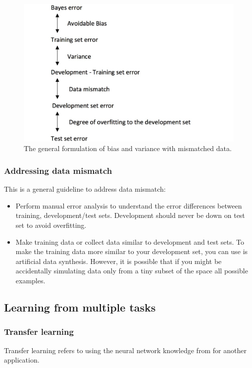 \documentclass[UTF8]{article}
\begin{document}
\begin{figure}[htb]
    \centering
    \includegraphics[width=40em]{figures/data-mismatched-general-formulation}
    \caption{The general formulation of bias and variance with mismatched data.}
    \label{fig:data-mismatched-general-formulation}
\end{figure}

\subsubsection{Addressing data mismatch}
This is a general guideline to address data mismatch:
\begin{itemize}
    \item Perform manual error analysis to understand the error differences between training,
    development/test sets. Development should never be down on test set to avoid overfitting.
    \item Make training data or collect data similar to development and test sets. To make the
    training data more similar to your development set, you can use is artificial data synthesis.
    However, it is possible that if you might be accidentally simulating data only from a tiny
    subset of the space all possible examples.
\end{itemize}

\subsection{Learning from multiple tasks}
\subsubsection{Transfer learning}
Transfer learning refers to using the neural network knowledge from for another application.
\end{document}
